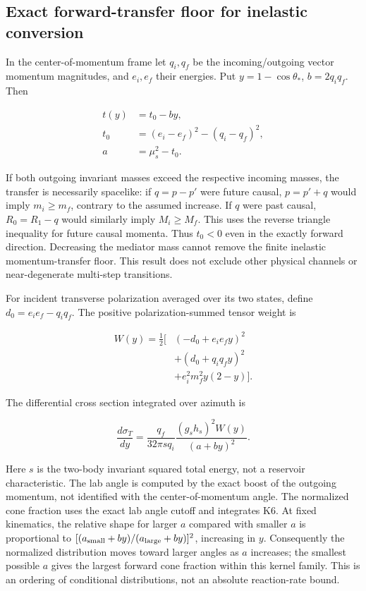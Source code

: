 \documentclass[
  11pt,
  twoside]{article}
\begin{document}
\subsection{Exact forward-transfer floor for inelastic
conversion}\label{exact-forward-transfer-floor-for-inelastic-conversion}

In the center-of-momentum frame let \(q_i,q_f\) be the incoming/outgoing
vector momentum magnitudes, and \(e_i,e_f\) their energies. Put
\(y=1-\cos\theta_*\), \(b=2q_iq_f\). Then

\[\begin{aligned}
t(y)&=t_0-by,\\
t_0&=(e_i-e_f)^2-(q_i-q_f)^2,\\
a&=\mu_s^2-t_0.
\end{aligned}\tag{K4}\]

If both outgoing invariant masses exceed the respective incoming masses,
the transfer is necessarily spacelike: if \(q=p-p'\) were future causal,
\(p=p'+q\) would imply \(m_i\geq m_f\), contrary to the assumed
increase. If \(q\) were past causal, \(R_0=R_1-q\) would similarly imply
\(M_i\geq M_f\). This uses the reverse triangle inequality for future
causal momenta. Thus \(t_0<0\) even in the exactly forward direction.
Decreasing the mediator mass cannot remove the finite inelastic
momentum-transfer floor. This result does not exclude other physical
channels or near-degenerate multi-step transitions.

For incident transverse polarization averaged over its two states,
define \(d_0=e_ie_f-q_iq_f\). The positive polarization-summed tensor
weight is

\[\begin{aligned}
W(y)=\frac12\big[&(-d_0+e_ie_f y)^2\\
&+(d_0+q_iq_f y)^2\\
&+e_i^2m_f^2 y(2-y)\big].
\end{aligned}\tag{K5}\]

The differential cross section integrated over azimuth is

\[\frac{d\sigma_T}{dy}=\frac{q_f}{32\pi s q_i}
\frac{(g_sh_s)^2 W(y)}{(a+by)^2}.\tag{K6}\]

Here \(s\) is the two-body invariant squared total energy, not a
reservoir characteristic. The lab angle is computed by the exact boost
of the outgoing momentum, not identified with the center-of-momentum
angle. The normalized cone fraction uses the exact lab angle cutoff and
integrates K6. At fixed kinematics, the relative shape for larger \(a\)
compared with smaller \(a\) is proportional to
\([(a_{\rm small}+by)/(a_{\rm large}+by)]^2\), increasing in \(y\).
Consequently the normalized distribution moves toward larger angles as
\(a\) increases; the smallest possible \(a\) gives the largest forward
cone fraction within this kernel family. This is an ordering of
conditional distributions, not an absolute reaction-rate bound.
\end{document}
